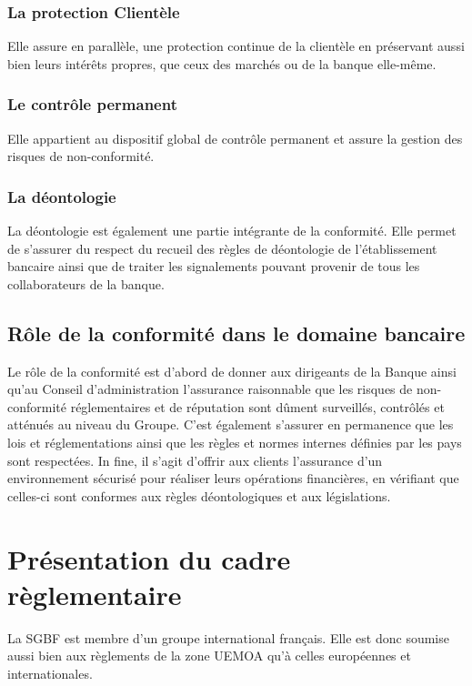 \subsubsection{La protection Clientèle}
Elle assure en parallèle, une protection continue de la clientèle en
préservant aussi bien leurs intérêts propres, que ceux des marchés ou de la 
banque elle-même.

\subsubsection{Le contrôle permanent}

Elle appartient au dispositif global de contrôle permanent et assure la
gestion des risques de non-conformité.

\subsubsection{La déontologie}

La déontologie est également une partie intégrante de la conformité. Elle
permet de s’assurer du respect du recueil des règles de déontologie de 
l’établissement bancaire ainsi que de traiter les signalements pouvant 
provenir de tous les collaborateurs de la banque.

\subsection{Rôle de la conformité dans le domaine bancaire}

Le rôle de la conformité est d’abord de donner aux dirigeants de la Banque 
ainsi qu’au Conseil d'administration l'assurance raisonnable que les risques 
de non-conformité réglementaires et de réputation sont dûment surveillés, 
contrôlés et atténués au niveau du Groupe. C’est également s'assurer en 
permanence que les lois et réglementations ainsi que les règles et normes 
internes définies par les pays sont respectées. In fine, il s’agit d’offrir 
aux clients l’assurance d’un environnement sécurisé pour réaliser leurs 
opérations financières, en vérifiant que celles-ci sont conformes aux règles 
déontologiques et aux législations.

\section{Présentation du cadre règlementaire}

La SGBF est membre d'un groupe international français. Elle est donc soumise
aussi bien aux règlements de la zone UEMOA qu'à celles européennes et 
internationales.

